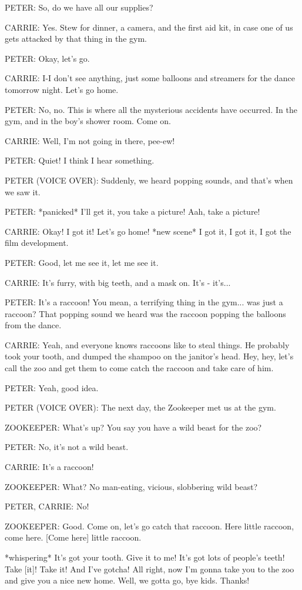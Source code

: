 PETER:
So, do we have all our supplies?

CARRIE:
Yes.
Stew for dinner, a camera, and the first aid kit, in case one of us gets attacked by that thing in the gym.

PETER:
Okay, let's go.

CARRIE:
I-I don't see anything, just some balloons and streamers for the dance tomorrow night.
Let's go home.

PETER:
No, no.
This is where all the mysterious accidents have occurred.
In the gym, and in the boy's shower room.
Come on.

CARRIE:
Well, I'm not going in there, pee-ew!

PETER:
Quiet!
I think I hear something.

PETER (VOICE OVER):
Suddenly, we heard popping sounds, and that's when we saw it.

PETER:
*panicked*
I'll get it, you take a picture!
Aah, take a picture!

CARRIE:
Okay!
I got it!
Let's go home!
*new scene*
I got it, I got it, I got the film development.

PETER:
Good, let me see it, let me see it.

CARRIE:
It's furry, with big teeth, and a mask on.
It's - it's...

PETER:
It's a raccoon!
You mean, a terrifying thing in the gym...
was just a raccoon?
That popping sound we heard was the raccoon popping the balloons from the dance.

CARRIE:
Yeah, and everyone knows raccoons like to steal things.
He probably took your tooth, and dumped the shampoo on the janitor's head.
Hey, hey, let's call the zoo and get them to come catch the raccoon and take care of him.

PETER:
Yeah, good idea.

PETER (VOICE OVER):
The next day, the Zookeeper met us at the gym.

ZOOKEEPER:
What's up?
You say you have a wild beast for the zoo?

PETER:
No, it's not a wild beast.

CARRIE:
It's a raccoon!

ZOOKEEPER:
What?
No man-eating, vicious, slobbering wild beast?

PETER, CARRIE:
No!

ZOOKEEPER:
Good.
Come on, let's go catch that raccoon.
Here little raccoon, come here.
    [Come here] little raccoon.

*whispering*
It's got your tooth.
Give it to me!
It's got lots of people's teeth!
Take [it]!
Take it!
And I've gotcha!
All right, now I'm gonna take you to the zoo and give you a nice new home.
Well, we gotta go, bye kids.
Thanks!

